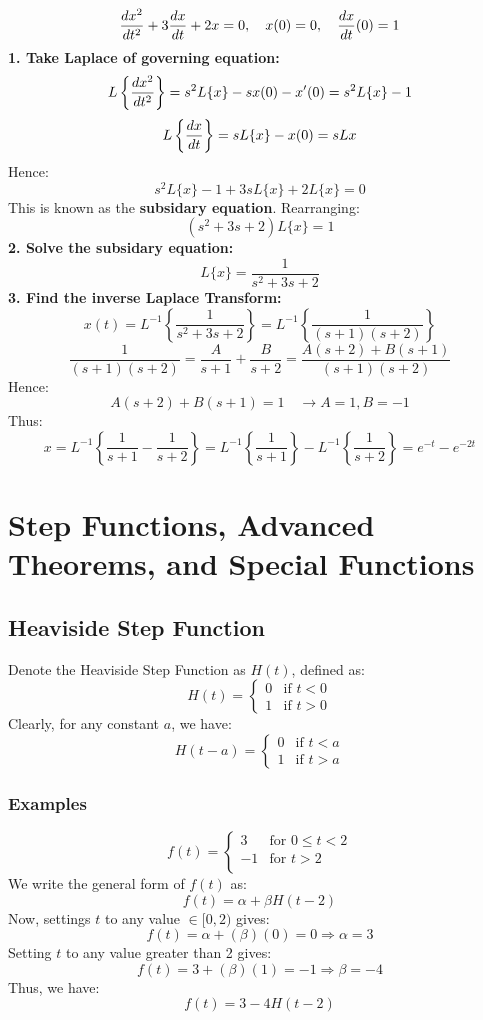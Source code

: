 \documentclass[a4paper, 10pt]{article}
\begin{document}
\begin{examplebox}
  \normalsize $$\frac{dx^2}{dt^2} + 3\frac{dx}{dt} + 2x = 0, \quad x(0) = 0, \quad \frac{dx}{dt}(0) = 1$$
  \textbf{1. Take Laplace of governing equation:}
  $$L\left\{\frac{dx^2}{dt^2}\right\} = s^2 L\{x\} - sx(0) - x'(0) = s^2 L\{x\} - 1$$
  $$L\left\{\frac{dx}{dt}\right\} = sL\{x\} - x(0) = sL{x}$$
  Hence:
  $$s^2 L\{x\} - 1 + 3sL\{x\} + 2L\{x\} = 0$$
  This is known as the \textbf{subsidary equation}. Rearranging:
  $$(s^2 + 3s + 2)L\{x\} = 1$$
  \textbf{2. Solve the subsidary equation:}
  $$L\{x\} = \frac{1}{s^2 + 3s + 2}$$
  \textbf{3. Find the inverse Laplace Transform:}
  $$x(t) = L^{-1} \left\{ \frac{1}{s^2 + 3s + 2} \right\} = L^{-1} \left\{ \frac{1}{(s+1)(s+2)}\right\} $$
  $$\frac{1}{(s+1)(s+2)} = \frac{A}{s+1} + \frac{B}{s+2} = \frac{A(s+2) + B(s+1)}{(s+1)(s+2)}$$
  Hence:
  $$A(s+2) + B(s+1) = 1 \quad \rightarrow A = 1, B = -1$$
  Thus:
  $$x = L^{-1} \left\{\frac{1}{s+1} - \frac{1}{s+2}\right\} = L^{-1} \left\{ \frac{1}{s+1}\right\}  - L^{-1}\left\{ \frac{1}{s+2}\right\} = e^{-t} - e^{-2t}$$
\end{examplebox}
\pagebreak
\section{Step Functions, Advanced Theorems, and Special Functions}
\subsection{Heaviside Step Function}
Denote the Heaviside Step Function as $H(t)$, defined as:
$$
  H(t) = \begin{cases}
    0 & \text{if } t < 0 \\
    1 & \text{if } t > 0
  \end{cases}
$$
Clearly, for any constant $a$, we have:
$$
  H(t-a) = \begin{cases}
    0 & \text{if } t < a \\
    1 & \text{if } t > a
  \end{cases}
$$

\subsubsection{Examples}

\begin{examplebox}
  $$f(t) = \begin{cases}
      3  & \text{for } 0 \leq t < 2 \\
      -1 & \text{for } t > 2        \\
    \end{cases}$$
  We write the general form of $f(t)$ as:
  $$f(t) = \alpha + \beta H(t-2)$$
  Now, settings $t$ to any value $\in [0,2)$ gives:
  $$f(t) = \alpha + (\beta)(0) = 0 \Rightarrow \alpha = 3$$
  Setting $t$ to any value greater than 2 gives:
  $$f(t) = 3 + (\beta)(1) = -1 \Rightarrow \beta = -4 $$
  Thus, we have:
  $$f(t) = 3 - 4H(t-2)$$
\end{examplebox}
\end{document}
